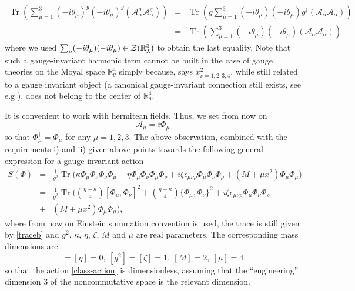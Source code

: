 \documentclass[a4paper,11pt,twoside]{article}
\numberwithin{equation}{section}
\DeclareMathOperator{\tr}{Tr}
\theoremstyle{nonumberplain}
\newcounter{and}
\begin{document}
%
\begin{eqnarray}
\tr(\sum_{\mu=1}^3(-i\theta_\mu)^g (-i\theta_\mu)^g (\mathcal{A}^g_\alpha \mathcal{A}^g_\alpha) ) &=& 
\tr( g \sum_{\mu=1}^3(-i\theta_\mu)(-i\theta_\mu) g^\dag (\mathcal{A}_\alpha \mathcal{A}_\alpha) )\nonumber\\
&=& \tr( \sum_{\mu=1}^3(-i\theta_\mu)(-i\theta_\mu) (\mathcal{A}_\alpha \mathcal{A}_\alpha) )
\label{harm-inv-dem}
\end{eqnarray}
%
where we used $\sum_\mu(-i\theta_\mu)(-i\theta_\mu)\in{\cal{Z}}(\mathbb{R}^3_\lambda)$ to obtain the last equality. Note that such a gauge-invariant harmonic term cannot be built in the case of gauge theories on the Moyal space $\mathbb{R}^4_\theta$ \cite{Wallet:2007c} simply because, says $x_{\nu=1,2,3,4}^2$, while still related to a gauge invariant object (a canonical gauge-invariant connection still exists, see e.g \cite{cgmw-20}), does not belong to the center of $\mathbb{R}^4_\theta$. \par%
%
It is convenient to work with hermitean fields. Thus, we set from now on
\begin{equation*}
\mathcal{A}_\mu = i \Phi_\mu
\end{equation*}
so that $\Phi^\dag_\mu = \Phi_\mu$ for any $\mu=1,2,3$. The above observation, combined with the requirements i) and ii) given above points towards the following general expression for a gauge-invariant action%
%
\begin{eqnarray}\label{fullaction}
S(\Phi)&=&\frac{1}{g^2} \tr\big( \kappa \Phi_\mu \Phi_\nu \Phi_\nu \Phi_\mu + \eta \Phi_\mu \Phi_\nu \Phi_\mu \Phi_\nu + i \zeta \epsilon_{\mu\nu\rho} \Phi_\mu \Phi_\nu \Phi_\rho + (M+\mu x^2) \Phi_\mu \Phi_\mu \big)\nonumber\\
&=&\frac{1}{g^2} \tr\big((\frac{\eta-\kappa}{4})[\Phi_\mu,\Phi_\nu]^2+(\frac{\eta+\kappa}{4})\{\Phi_\mu,\Phi_\nu \}^2
+ i \zeta \epsilon_{\mu\nu\rho} \Phi_\mu \Phi_\nu \Phi_\rho\nonumber\\
&+& (M+\mu x^2) \Phi_\mu \Phi_\mu \big), \label{class-action}
\end{eqnarray}
%
where from now on Einstein summation convention is used, the trace is still given by \eqref{traceb} and $g^2$, $\kappa$, $\eta$, $\zeta$, $M$ and $\mu$ are real parameters. The corresponding mass dimensions are
\begin{equation}
[\kappa]=[\eta]=0,\ [g^2]=[\zeta]=1,\ [M]=2,\ [\mu]=4\label{mass-dim}
\end{equation}
so that the action \eqref{class-action} is dimensionless, assuming that the ``engineering'' dimension $3$ of the noncommutative space is the relevant dimension.\par%
\end{document}
